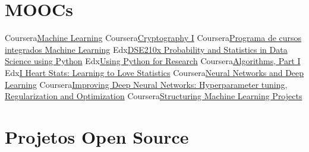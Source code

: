 \documentclass[11pt,a4paper,sans]{moderncv}        %
\begin{document}
\section{MOOCs}
\cvdoubleitem
  {Coursera}{\href{https://www.coursera.org/account/accomplishments/verify/CWFKK68KQP9X}{Machine Learning}}
  {Coursera}{\href{https://www.coursera.org/api/legacyCertificates.v1/spark/statementOfAccomplishment/976353~15102768/pdf}{Cryptography I}}
\cvdoubleitem
  {Coursera}{\href{https://www.coursera.org/account/accomplishments/specialization/YHKBDQ77K2GB}{Programa de cursos integrados Machine Learning}}
  {Edx}{\href{https://www.edx.org/course/probability-and-statistics-in-data-science-using-python}{DSE210x Probability and Statistics in Data Science using Python}}
\cvdoubleitem
  {Edx}{\href{https://www.edx.org/course/using-python-for-research}{Using Python for Research}}
  {Coursera}{\href{https://www.coursera.org/learn/algorithms-part1}{Algorithms, Part I}}
\cvdoubleitem
  {Edx}{\href{https://www.edx.org/course/i-heart-stats-learning-love-statistics-notredamex-soc120x}{I Heart Stats: Learning to Love Statistics}}
  {Coursera}{\href{https://www.coursera.org/account/accomplishments/verify/RY4DLN2Q6MW3}{\footnotesize{Neural Networks and Deep Learning}}}
\cvdoubleitem
  {Coursera}{\href{https://www.coursera.org/account/accomplishments/verify/6SEWP83D96QM}{Improving Deep Neural Networks: Hyperparameter tuning, Regularization and Optimization}}
  {Coursera}{\href{https://www.coursera.org/account/accomplishments/verify/BBTE8KJC6WRU}{Structuring Machine Learning Projects}}

\section{Projetos Open Source}
\end{document}
